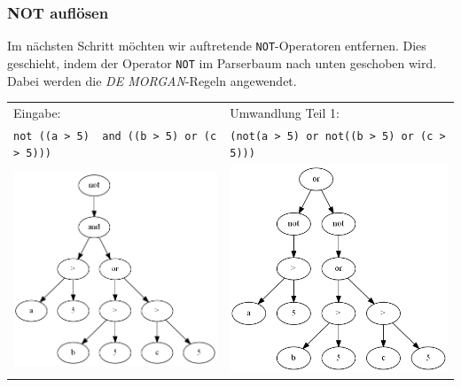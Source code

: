 \subsubsection{NOT auflösen}

Im nächsten Schritt möchten wir auftretende \verb|NOT|-Operatoren entfernen. Dies geschieht, indem der Operator \verb|NOT| im Parserbaum nach unten geschoben wird. Dabei werden die \textit{DE MORGAN}-Regeln angewendet. 

\begin{tabular}{ll}
Eingabe: & Umwandlung Teil 1:\\
\verb|not ((a > 5)  and ((b > 5) or (c > 5)))| & \verb|(not(a > 5) or not((b > 5) or (c > 5)))|\\
\includegraphics[scale=0.5]{Bilder/not_graph1.png} & \includegraphics[scale=0.5]{Bilder/not_graph2.png}\\
\end{tabular}

